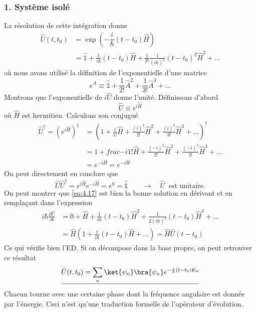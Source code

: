 		\subsubsection{1. Système isolé}
		La résolution de cette intégration donne
		\begin{equation}
		\begin{array}{ll}
		\hat{U}(t,t_0) &= \exp\left(-\dfrac{i}{\hbar}(t-t_0)\hat{H}\right)\\
		&= \hat{\mathbb{1}} + \frac{1}{i\hbar}(t-t_0)\hat{H} + \frac{1}{2!}\frac{1}{(i\hbar)^2}
		(t-t_0)^2\hat{H}^2 + \dots
		\end{array}
		\label{eq:4.17}
		\end{equation}				
		où nous avons utilisé la définition de l'exponentielle d'une matrice
		\begin{equation}
		e^{\hat{A}} \equiv \hat{\mathbb{1}} + \frac{1}{2!}\hat{A}^2+\frac{1}{3!}\hat{A}^3+\dots
		\end{equation}				
		Montrons que l'exponentielle de $i\hat U$ donne l'unité. Définissons d'abord
		\begin{equation}
		\hat{U} \equiv e^{i\hat{H}}
		\end{equation}
		où $\hat{H}$ est hermitien. Calculons son conjugué
		\begin{equation}
		\begin{array}{ll}
		\hat{U}^\dagger =\left(e^{i\hat{H}}\right)^\dagger &= \left(1+\frac{i}{1!}	\hat{H}+
		\frac{(i)^2}{2!}\hat{H}^2+\frac{(i)^3}{3!}\hat{H}^3 + \dots\right)^\dagger\\
		&= 1 + frac{-i}{1!}	\hat{H}+\frac{(-i)^2}{2!}\hat{H}^2 +\frac{(-i)^3}{3!}\hat{H}^3 + \dots\\
		&= e^{-i\hat{H}} = e^{-i\hat{H}}
		\end{array}
		\end{equation}
		On peut directement en conclure que
		\begin{equation}
		\hat{U}\hat{U}^\dagger = e^{i\hat{H}}e^{-i\hat{H}} = e^0 = \hat{\mathbb{1}}\qquad \rightarrow\quad
		\hat{U}\ \text{ est unitaire.}
		\end{equation}
		On peut montrer que \autoref{eq:4.17} est bien la bonne solution en dérivant et en 
		remplaçant dans l'expression
		\begin{equation}
		\begin{array}{ll}
		i\hbar\frac{\partial \hat U}{\partial t} &= 0 + \hat{H} + \frac{1}{i\hbar}(t-t_0)
		\hat{H}^2 + \frac{1}{2(i\hbar)^3}(t-t_0)\hat{H}^3+\dots\\
		&= \hat{H}\left(1+\frac{1}{i\hbar}(t-t_0)\hat{H}+\dots\right) = \hat{H}\hat{U}(t-t_0)
		\end{array}
		\end{equation}
		Ce qui vérifie bien l'ED. Si on décompose dans la base propre, on peut retrouver ce résultat
		\begin{equation}
		\underline{\hat{U}(t,t_0) = \sum_n \ket{\psi_n}\bra{\psi_n}e^{-\frac{i}{\hbar}(t-t_0)E_n}}
		\end{equation}
		Chacun tourne avec une certaine phase dont la fréquence angulaire est donnée par l'énergie. Ceci 
		n'est qu'une traduction formelle de l'opérateur d'évolution.\\
		
